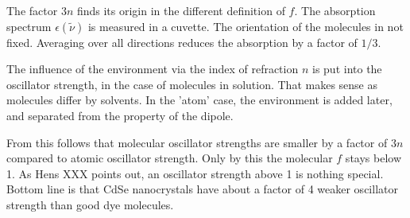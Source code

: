 \documentclass[a4paper,10pt]{article}
\begin{document}
The factor $3n$ finds its origin in the different definition of $f$. The
absorption spectrum $\epsilon(\tilde{\nu})$
is measured in a cuvette. The orientation of the molecules in not fixed.
Averaging over all directions
reduces the absorption by a factor of $1/3$.

The influence of the environment via the  index of refraction $n$ is put into the
oscillator strength, in the
case of molecules in solution. That makes sense as molecules differ by solvents.
In the 'atom' case,
the environment is added later, and separated from the property of the dipole.

From this follows that molecular oscillator strengths are smaller by a factor of
$3n$ compared to atomic
oscillator strength. Only by this the molecular $f$ stays below 1.  As Hens XXX points out, an oscillator strength above 1 is nothing special. Bottom line is that
CdSe nanocrystals have about a factor of 4 weaker oscillator strength than good dye molecules.
\end{document}
